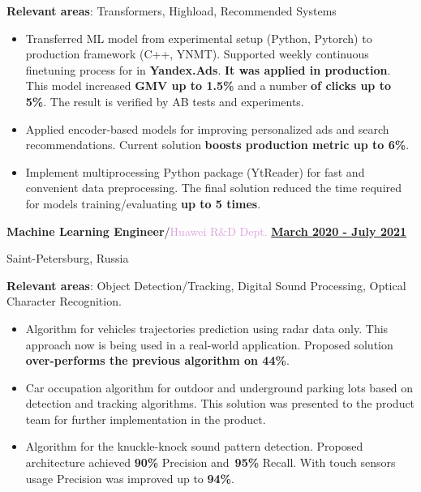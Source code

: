 \documentclass[10pt,a4paper]{report}
\begin{document}
\textbf{Relevant areas}: Transformers, Highload, Recommended Systems
\begin{itemize}[label={}, left=10pt]

    \item  Transferred ML model from experimental setup (Python, Pytorch) to production framework (C++, YNMT). Supported weekly continuous finetuning process for in \textbf{Yandex.Ads}. \textbf{It was applied in production}. This model increased \textbf{GMV up to 1.5\%} and a number \textbf{of clicks up to 5\%}. The result is verified by AB tests and experiments.
    
    \item Applied encoder-based models for improving personalized ads and search recommendations. Current solution \textbf{boosts production metric up to 6\%}.
    
    \item Implement multiprocessing Python package (YtReader) for fast and convenient data preprocessing. The final solution reduced the time required for models training/evaluating \textbf{up to 5 times}. 
\end{itemize}

\textbf{\large{Machine Learning Engineer}}/\textcolor{Plum}{Huawei R\&D Dept.}
\hfill
\textbf {\underline{March 2020 - July 2021}}

Saint-Petersburg, Russia

\textbf{Relevant areas}: Object Detection/Tracking, Digital Sound Processing, Optical Character Recognition.

\begin{itemize}[label={}, left=10pt]
    \item Algorithm for vehicles trajectories prediction using radar data only. This approach now is being used in a real-world application. Proposed solution \textbf{over-performs the previous algorithm on 44\%}. 
    
    \item Car occupation algorithm for outdoor and underground parking lots based on detection and tracking algorithms. This solution was presented to the product team for further implementation in the product.
    
    \item Algorithm for the knuckle-knock sound pattern detection. Proposed architecture achieved \textbf{90\%} Precision and~\textbf{95\%} Recall. With touch sensors usage Precision was improved up to \textbf{94\%}.
\end{itemize}
\end{document}
